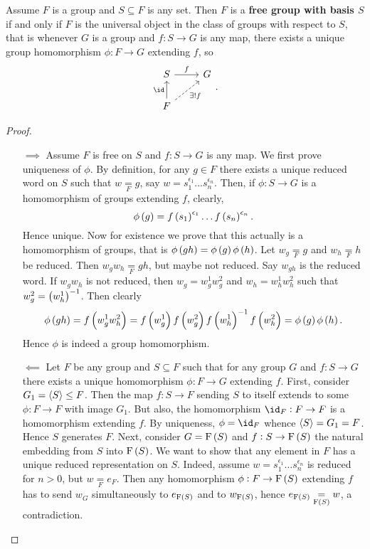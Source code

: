 \begin{proposition}
\label{prop:1.4.6}
Assume $ F $ is a group and $ S \subseteq F $ is any set. Then $ F $ is a \textbf{free group with basis $ S $} if and only if $ F $ is the universal object in the class of groups with respect to $ S $, that is whenever $ G $ is a group and $ f : S \to G $ is any map, there exists a unique group homomorphism $ \phi : F \to G $ extending $ f $, so
$$
\begin{tikzcd}
S \arrow{r}{f} & G \\
F \arrow{u}{\id} \arrow[dashed, swap]{ur}{\exists !f} &
\end{tikzcd}.
$$
\end{proposition}

\begin{proof}
\hfill
\begin{itemize}
\item[$ \implies $] Assume $ F $ is free on $ S $ and $ f : S \to G $ is any map. We first prove uniqueness of $ \phi $. By definition, for any $ g \in F $ there exists a unique reduced word on $ S $ such that $ w \underset{F}{=} g $, say $ w = s_1^{\epsilon_1} \dots s_n^{\epsilon_n} $. Then, if $ \phi : S \to G $ is a homomorphism of groups extending $ f $, clearly,
$$ \phi\br{g} = f\br{s_1}^{\epsilon_1} \dots f\br{s_n}^{\epsilon_n}. $$
Hence unique. Now for existence we prove that this actually is a homomorphism of groups, that is $ \phi\br{gh} = \phi\br{g}\phi\br{h} $. Let $ w_g \underset{F}{=} g $ and $ w_h \underset{F}{=} h $ be reduced. Then $ w_gw_h \underset{F}{=} gh $, but maybe not reduced. Say $ w_{gh} $ is the reduced word. If $ w_gw_h $ is not reduced, then $ w_g = w_g^1w_g^2 $ and $ w_h = w_h^1w_h^2 $ such that $ w_g^2 = \br{w_h^1}^{-1} $. Then clearly
$$ \phi\br{gh} = f\br{w_g^1w_h^2} = f\br{w_g^1}f\br{w_g^2}f\br{w_h^1}^{-1}f\br{w_h^2} = \phi\br{g}\phi\br{h}. $$
Hence $ \phi $ is indeed a group homomorphism.

\pagebreak

\item[$ \impliedby $] Let $ F $ be any group and $ S \subseteq F $ such that for any group $ G $ and $ f : S \to G $ there exists a unique homomorphism $ \phi : F \to G $ extending $ f $. First, consider $ G_1 = \left\langle S \right\rangle \le F $. Then the map $ f : S \to F $ sending $ S $ to itself extends to some $ \phi : F \to F $ with image $ G_1 $. But also, the homomorphism $ \id_F : F \to F $ is a homomorphism extending $ f $. By uniqueness, $ \phi = \id_F $ whence $ \left\langle S \right\rangle = G_1 = F $. Hence $ S $ generates $ F $. Next, consider $ G = \F\br{S} $ and $ f : S \to \F\br{S} $ the natural embedding from $ S $ into $ \F\br{S} $. We want to show that any element in $ F $ has a unique reduced representation on $ S $. Indeed, assume $ w = s_1^{\epsilon_1} \dots s_n^{\epsilon_n} $ is reduced for $ n > 0 $, but $ w \underset{F}{=} e_F $. Then any homomorphism $ \phi : F \to \F\br{S} $ extending $ f $ has to send $ w_G $ simultaneously to $ e_{\F\br{S}} $ and to $ w_{\F\br{S}} $, hence $ e_{\F\br{S}} \underset{\F\br{S}}{=} w $, a contradiction.
\end{itemize}
\end{proof}

